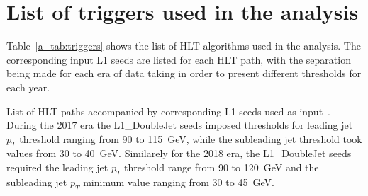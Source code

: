 
\section{List of triggers used in the analysis}
\label{app:trigger_list}
\hspace{10pt} Table~\ref{a_tab:triggers} shows the list of HLT algorithms used in the analysis. The corresponding input L1 seeds are listed for each HLT path, with the separation being made for each era of data taking in order to present different thresholds for each year.

\begin{table}

    \centering
    \def\arraystretch{1.5}

    \small
    \caption{List of HLT paths accompanied by corresponding L1 seeds used as input~\cite{note:AN_19_257}.
    During the 2017 era the L1\_DoubleJet seeds imposed thresholds for leading jet $p_T$ threshold ranging from 90 to 115~GeV, while the subleading jet threshold took values from 30 to 40~GeV.
    Similarely for the 2018 era, the L1\_DoubleJet seeds required the leading jet $p_T$ threshold range from 90 to 120~GeV and the subleading jet $p_T$ minimum value ranging from 30 to 45~GeV.}


\end{table}
